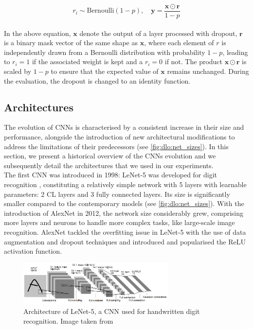 \begin{equation}
  \label{eqn:dlo:dropout}
    r_i \sim \text{Bernoulli}(1 - p), \quad
    \mathbf{y} = \frac{\mathbf{x} \odot \mathbf{r}}{1 - p} 
\end{equation}\\

In the above equation, $\mathbf{x}$ denote the output of a layer processed with
dropout, $\mathbf{r}$ is a binary mask vector of the same shape as $\mathbf{x}$,
where each element of $r$ is independently drawn from a Bernoulli distribution
with probability $1-p$, leading to $r_i=1$ if the associated weight is kept and
a $r_i=0$ if not. The product $\mathbf{x} \odot \mathbf{r}$ is scaled by $1-p$
to ensure that the expected value of $\mathbf{x}$ remains unchanged. During the
evaluation, the dropout is changed to an identity function.

\subsection{Architectures}\label{sec:dlo:architectures}

The evolution of \aclp{CNN} is characterised by a consistent increase in their
size and performance, alongside the introduction of new architectural
modifications to address the limitations of their predecessors (see
\cref{fig:dlo:net_sizes}). In this section, we present a historical overview of
the \acp{CNN} evolution and we subsequently detail the architectures that we
used in our experiments.\\

The first \ac{CNN} was introduced in 1998: LeNet-5 was developed for digit
recognition \cite{DBLP:journals/pieee/LeCunBBH98}, constituting a relatively
simple network with 5 layers with learnable parameters: 2 \ac{CL} layers
and 3 fully connected layers. Its size is significantly smaller compared to the
contemporary models (see \cref{fig:dlo:net_sizes}). With the introduction of
AlexNet \cite{DBLP:conf/nips/KrizhevskySH12} in 2012, the network size
considerably grew, comprising more layers and neurons to handle more complex
tasks, like large-scale image recognition. AlexNet tackled the overfitting issue
in LeNet-5 with the use of data augmentation and dropout techniques and
introduced and popularised the \ac{ReLU} activation function.\\

\begin{figure}[htbp]
  \centering
  \includegraphics[width=0.70\textwidth]{chapter_sota/assets/lenet.png}
  \caption{Architecture of LeNet-5, a \acl{CNN} used for handwritten digit
    recognition. Image taken from \cite{DBLP:journals/pieee/LeCunBBH98}}
  \label{fig:dlo:lenet5}
\end{figure}


